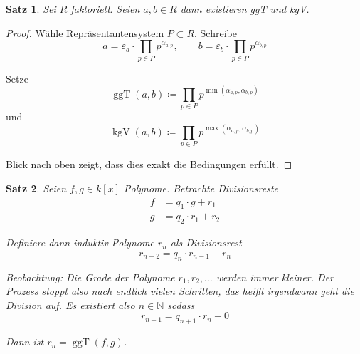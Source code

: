 \documentclass[a4paper,12pt,numbers=noenddot,parskip=full]{scrartcl}
\newcommand{\setN}{\mathbb{N}}
\theoremstyle{dotless}
\newtheorem{theorem}{Satz}[section]
\theoremstyle{remark}
\begin{document}
	\begin{theorem}
		Sei $R$ faktoriell. Seien $a,b \in R$ dann existieren ggT und kgV.
	\end{theorem}

	\begin{proof}
		Wähle Repräsentantensystem $P \subset R$. Schreibe
		\begin{equation*}
			a = \varepsilon_a \cdot \prod_{p \in P} p^{\alpha_{a,p}}, \qquad b = \varepsilon_b \cdot \prod_{p \in P} p^{\alpha_{b,p}}
		\end{equation*}
		
		Setze
		\begin{equation*}
			\operatorname{ggT}(a,b) \coloneqq \prod_{p \in P} p^{\min(\alpha_{a,p}, \alpha_{b,p})}
		\end{equation*}
		und
		\begin{equation*}
			\operatorname{kgV}(a,b) \coloneqq \prod_{p \in P} p^{\max(\alpha_{a,p}, \alpha_{b,p})}
		\end{equation*}
		
		Blick nach oben zeigt, dass dies exakt die Bedingungen erfüllt.
	\end{proof}

	\begin{theorem}
		Seien $f,g \in k[x]$ Polynome. Betrachte Divisionsreste
		\begin{align*}
			f &= q_1 \cdot g + r_1 \tag{1}\\
			g &= q_2 \cdot r_1 + r_2 \tag{2}
		\end{align*}
		
		Definiere dann induktiv Polynome $r_n$ als Divisionsrest
		\begin{equation*}
			r_{n-2} = q_n \cdot r_{n-1} + r_n \tag{n}
		\end{equation*}
		
		\textit{Beobachtung:} Die Grade der Polynome $r_1, r_2, \dots$ werden immer kleiner. Der Prozess stoppt also nach endlich vielen Schritten, das heißt irgendwann geht die Division auf. Es existiert also $n \in \setN$ sodass
		\begin{equation*}
			r_{n-1} = q_{n+1} \cdot r_n + 0 \tag{n+1}
		\end{equation*}
		
		Dann ist $r_n = \operatorname{ggT}(f,g)$.
	\end{theorem}
\end{document}
